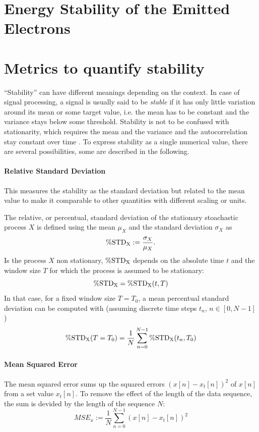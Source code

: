 \section{Energy Stability of the Emitted Electrons}

\section{Metrics to quantify stability}\label{sec:metrics}
``Stability'' can have different meanings depending on the context. In case of signal processing, a signal is usually said to be \textit{stable} if it has only little variation around its mean or some target value, i.e. the mean has to be constant and the variance stays below some threshold. 
Stability is not to be confused with stationarity, which requires the mean and the variance and the autocorrelation stay constant over time \cite{Guthrie2020}. To express stability as a single numerical value, there are several possibilities, some are described in the following.

\paragraph{Relative Standard Deviation}
This measures the stability as the standard deviation but related to the mean value to make it comparable to other quantities with different scaling or units.

The relative, or percentual, standard deviation of the stationary stoachastic process $X$ is defined using the mean $\mu_X$ and the standard deviation $\sigma_X$ as
\begin{equation}
\operatorname{\%STD_X} := \frac{\sigma_X}{\mu_X}.
\end{equation}
Is the process $X$ non stationary, $\operatorname{\%STD_X}$ depends on the absolute time $t$ and the window size $T$ for which the process is assumed to be stationary:
\begin{equation}
\operatorname{\%STD_X} = \operatorname{\%STD_X}(t,T)
\end{equation}
In that case, for a fixed window size $T=T_0$, a mean percentual standard deviation can be computed with (assuming discrete time steps $t_n$, $n\in[0,N-1]$)
\begin{equation}
\operatorname{\%STD_X}(T=T_0) = \frac{1}{N} \sum_{n=0}^{N-1} \operatorname{\%STD_X}(t_n,T_0)
\end{equation}

\paragraph{Mean Squared Error}
The mean squared error sums up the squared errors $\left(x[n] - x_t[n]\right)^2$ of $x[n]$ from a set value $x_t[n]$. To remove the effect of the length of the data sequence, the sum is devided by the length of the sequence $N$:
\begin{equation}
MSE_x := \frac{1}{N} \sum_{n=0}^{N-1} \left(x[n] - x_t[n]\right)^2
\end{equation}

